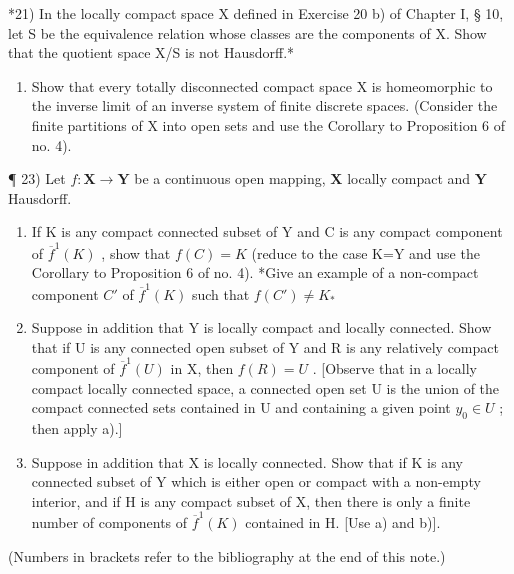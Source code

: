 *21) In the locally compact space X defined in Exercise 20 b) of Chapter I, § 10, let S be the equivalence relation whose classes are the components of X. Show that the quotient space X/S is not Hausdorff.*

\begin{enumerate}
\def\labelenumi{\arabic{enumi})}
\setcounter{enumi}{21}
\tightlist
\item
  Show that every totally disconnected compact space X is homeomorphic to the inverse limit of an inverse system of finite discrete spaces. (Consider the finite partitions of X into open sets and use the Corollary to Proposition 6 of no. 4).
\end{enumerate}

¶ 23) Let \(f: \mathbf{X} \to \mathbf{Y}\) be a continuous open mapping, \(\mathbf{X}\) locally compact and \(\mathbf{Y}\) Hausdorff.

\begin{enumerate}
\def\labelenumi{\alph{enumi})}
\item
  If K is any compact connected subset of Y and C is any compact component of \(\overline{f}^{1}(K)\) , show that \(f(C)=K\) (reduce to the case K=Y and use the Corollary to Proposition 6 of no. 4). *Give an example of a non-compact component \(C'\) of \(\overline{f}^{1}(K)\) such that \(f(C')\neq K_*\)
\item
  Suppose in addition that Y is locally compact and locally connected. Show that if U is any connected open subset of Y and R is any relatively compact component of \(\overline{f}^{1}(U)\) in X, then \(f(R)=U\) . {[}Observe that in a locally compact locally connected space, a connected open set U is the union of the compact connected sets contained in U and containing a given point \(y_{0}\in U\) ; then apply a).{]}
\item
  Suppose in addition that X is locally connected. Show that if K is any connected subset of Y which is either open or compact with a non-empty interior, and if H is any compact subset of X, then there is only a finite number of components of \(\overline{f}^{1}(K)\) contained in H. {[}Use a) and b){]}.
\end{enumerate}


(Numbers in brackets refer to the bibliography at the end of this note.)

